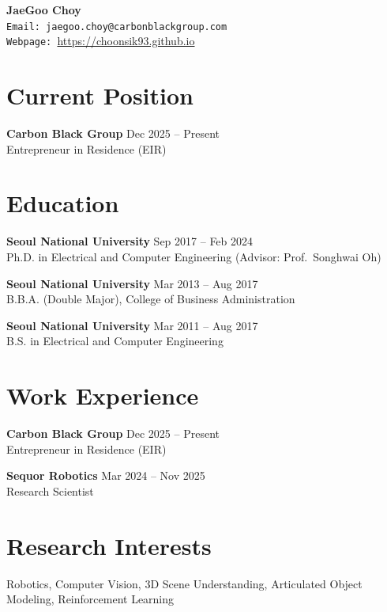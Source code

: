 \documentclass[10pt]{article}
\begin{document}
{\LARGE \textbf{JaeGoo Choy}} \hfill \\[2pt]
\texttt{Email: jaegoo.choy@carbonblackgroup.com} \\
\texttt{Webpage: }\url{https://choonsik93.github.io}

\section{Current Position}
\textbf{Carbon Black Group} \hfill Dec 2025 -- Present \\
Entrepreneur in Residence (EIR)

\section{Education}
\textbf{Seoul National University} \hfill Sep 2017 -- Feb 2024 \\
Ph.D. in Electrical and Computer Engineering (Advisor: Prof.\ Songhwai Oh)

\textbf{Seoul National University} \hfill Mar 2013 -- Aug 2017 \\
B.B.A. (Double Major), College of Business Administration

\textbf{Seoul National University} \hfill Mar 2011 -- Aug 2017 \\
B.S. in Electrical and Computer Engineering

\section{Work Experience}
\textbf{Carbon Black Group} \hfill Dec 2025 -- Present \\
Entrepreneur in Residence (EIR)

\textbf{Sequor Robotics} \hfill Mar 2024 -- Nov 2025 \\
Research Scientist


\section{Research Interests}
Robotics, Computer Vision, 3D Scene Understanding, Articulated Object Modeling, Reinforcement Learning

\end{document}
